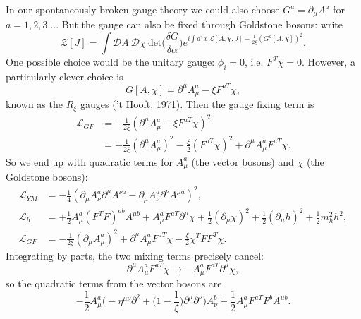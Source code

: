 In our spontaneously broken gauge theory we could also choose $G^a = \partial_\mu A^a$ for $a=1,2,3...$. But the gauge can also be fixed through Goldstone bosons: write
\begin{equation}
\mathcal{Z}[J]= \int \mathcal{D}A\ \mathcal{D}\chi\ \text{det}\bigg(\frac{\delta G}{\delta \alpha} \bigg) e^{i\int d^4x\ \mathcal{L}[A, \chi, J] - \frac{1}{2\xi}(G^a[A, \chi])^2}.
\end{equation}
One possible choice would be the unitary gauge: $\phi_i = 0$, i.e. $F^T\chi = 0$. However, a particularly clever choice is
\begin{equation}
G[A, \chi] = \partial^\mu A_\mu^a - \xi F^{a T}\chi,
\end{equation}
known as the $R_\xi$ gauges ('t Hooft, 1971). Then the gauge fixing term is
\begin{equation}
\begin{split}
\mathcal{L}_{GF} &= - \frac{1}{2\xi}(\partial^\mu A_\mu^a - \xi F^{a T}\chi)^2 \\
&= - \frac{1}{2 \xi}(\partial^\mu A_\mu^a)^2 - \frac{\xi}{2}(F^{a T}\chi)^2 + \partial^\mu A_\mu^a F^{a T}\chi.
\end{split}
\end{equation}
So we end up with quadratic terms for $A_\mu^a$ (the vector bosons) and $\chi$ (the Goldstone bosons):
\begin{equation}
\begin{split}
\mathcal{L}_{YM} &= -\frac{1}{4}(\partial_\mu A_\nu^a \partial^\mu A^{\nu a} - \partial_\mu A_\nu^a \partial^\nu A^{\mu a})^2, \\
\mathcal{L}_h &= + \frac{1}{2}A_\mu^a(F^TF)^{ab}A^{\mu b} + A_\mu^a F^{a T}\partial^\mu \chi + \frac{1}{2}(\partial_\mu \chi)^2 + \frac{1}{2}(\partial_\mu h)^2 + \frac{1}{2}m_h^2 h^2, \\
\mathcal{L}_{GF} &= - \frac{1}{2\xi}(\partial_\mu A_\mu^a)^2 + \partial^\mu A_\mu^a F^{a T} \chi - \frac{\xi}{2} \chi^T F F^T \chi.
\end{split}
\end{equation}
Integrating by parts, the two mixing terms precisely cancel:
\begin{equation}
\partial^\mu A_\mu^a F^{a T}\chi \to - A_\mu^a F^{a T} \partial^\mu \chi,
\end{equation}
so the quadratic terms from the vector bosons are
\begin{equation}
-\frac{1}{2}A_\mu^a \bigg(-\eta^{\mu \nu}\partial^2 + \bigg(1-\frac{1}{\xi}\bigg)\partial^\mu \partial^\nu\bigg)A_\nu^b + \frac{1}{2}A_\mu^a F^{a T}F^b A^{\mu b}.
\end{equation}
